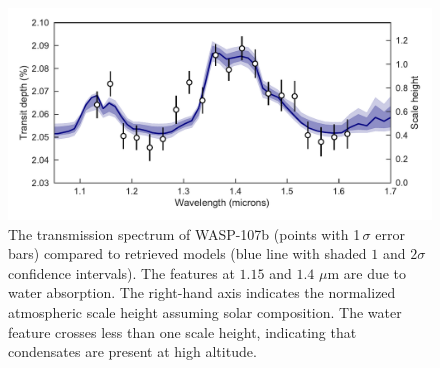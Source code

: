 \documentclass[twocolumn, trackchanges]{aastex61}
\begin{document}
\begin{figure}
\includegraphics[width = \textwidth]{fig2_spectrum.pdf}
\caption{The transmission spectrum of WASP-107b (points with 1\,$\sigma$ error bars) compared to retrieved models (blue line with shaded $1$ and $2\sigma$ confidence intervals). The features at $1.15$ and $1.4$ $\mu$m are due to water absorption. The right-hand axis indicates the normalized atmospheric scale height assuming solar composition. The water feature crosses less than one scale height, indicating that condensates are present at high altitude.} 
\label{fig:spectrum}
\end{figure}
\end{document}
